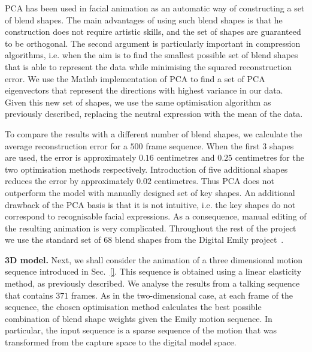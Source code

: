 \documentclass[11pt]{report}
\begin{document}
PCA has been used in facial animation as an automatic way of constructing a set of blend shapes. The main advantages of using such blend shapes is that he construction does not require artistic skills, and the set of shapes are guaranteed to be orthogonal. The second argument is particularly important in compression algorithms, i.e. when the aim is to find the smallest possible set of blend shapes that is able to represent the data while minimising the squared reconstruction error. We use the Matlab implementation of PCA to find a set of PCA eigenvectors that represent the directions with highest variance in our data. Given this new set of shapes, we use the same optimisation algorithm as previously described, replacing the neutral expression with the mean of the data.

To compare the results with a different number of blend shapes, we calculate the average reconstruction error for a $500$ frame sequence. When the first $3$ shapes are used, the error is approximately $0.16$ centimetres and $0.25$ centimetres for the two optimisation methods respectively. Introduction of five additional shapes reduces the error by approximately $0.02$ centimetres. Thus PCA does not outperform the model with manually designed set of key shapes. An additional drawback of the PCA basis is that it is not intuitive, i.e. the key shapes do not correspond to recognisable facial expressions. As a consequence, manual editing of the resulting animation is very complicated. Throughout the rest of the project we use the standard set of $68$ blend shapes from the Digital Emily project~\cite{Alexander:2009}.

\textbf{3D model.} Next, we shall consider the animation of a three dimensional motion sequence introduced in Sec.~\ref{}. This sequence is obtained using a linear elasticity method, as previously described. We analyse the results from a talking sequence that contains $371$ frames. As in the two-dimensional case, at each frame of the sequence, the chosen optimisation method calculates the best possible combination of blend shape weights given the Emily motion sequence. In particular, the input sequence is a sparse sequence of the motion that was transformed from the capture space to the digital model space. 
\end{document}
